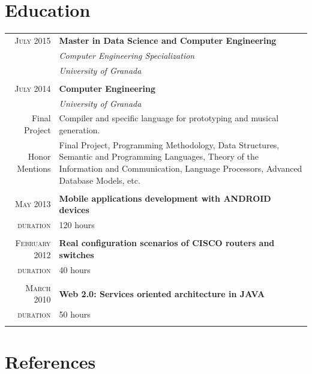 \documentclass[a4paper,10pt]{article} %
\newcommand{\duration}{\textcolor{linkcolour}{\textsc{duration}}}
\newcommand{\fproject}{\textcolor{linkcolour}{Final Project}}
\newcommand{\hmentions}{\textcolor{linkcolour}{Honor Mentions}}
\begin{document}

\section{Education}

\begin{tabular}{r|p{11cm}}

\textsc{July 2015} & \textbf{Master in Data Science and Computer Engineering} \\
                   & \emph{Computer Engineering
Specialization}\\
& \emph{University of Granada} \\
\multicolumn{2}{c}{} \\

\textsc{July} 2014 & \textbf{Computer Engineering} \\
 & \emph{University of Granada}\\ 
 \fproject & Compiler and specific language for prototyping and musical
generation.\\ 
\hmentions & Final Project, Programming Methodology, Data Structures,
Semantic and Programming Languages, Theory of the Information and Communication, Language
Processors, Advanced Database Models, etc.\\
\multicolumn{2}{c}{} \\

\textsc{May} 2013 & \textbf{Mobile applications development with ANDROID
devices}\\
\duration & 120 hours \\
\multicolumn{2}{c}{} \\

\textsc{February} 2012 & \textbf{Real configuration scenarios of CISCO routers
and switches}\\
\duration & 40 hours \\
\multicolumn{2}{c}{} \\

\textsc{March} 2010 & \textbf{Web 2.0: Services oriented architecture in JAVA}\\
\duration & 50 hours\\
\multicolumn{2}{c}{} \\
\end{tabular}

\section{References}
\end{document}
